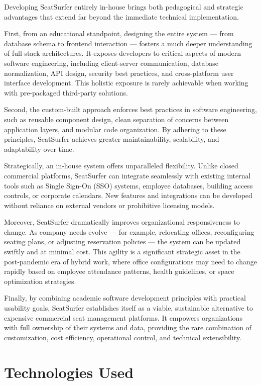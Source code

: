 \documentclass[12pt,a4paper]{report} %
\begin{document}
Developing SeatSurfer entirely in-house brings both pedagogical and strategic advantages that extend far beyond the immediate technical implementation.

First, from an educational standpoint, designing the entire system — from database schema to frontend interaction — fosters a much deeper understanding of full-stack architectures. It exposes developers to critical aspects of modern software engineering, including client-server communication, database normalization, API design, security best practices, and cross-platform user interface development. This holistic exposure is rarely achievable when working with pre-packaged third-party solutions.

Second, the custom-built approach enforces best practices in software engineering, such as reusable component design, clean separation of concerns between application layers, and modular code organization. By adhering to these principles, SeatSurfer achieves greater maintainability, scalability, and adaptability over time.

Strategically, an in-house system offers unparalleled flexibility. Unlike closed commercial platforms, SeatSurfer can integrate seamlessly with existing internal tools such as Single Sign-On (SSO) systems, employee databases, building access controls, or corporate calendars. New features and integrations can be developed without reliance on external vendors or prohibitive licensing models.

Moreover, SeatSurfer dramatically improves organizational responsiveness to change. As company needs evolve — for example, relocating offices, reconfiguring seating plans, or adjusting reservation policies — the system can be updated swiftly and at minimal cost. This agility is a significant strategic asset in the post-pandemic era of hybrid work, where office configurations may need to change rapidly based on employee attendance patterns, health guidelines, or space optimization strategies.

Finally, by combining academic software development principles with practical usability goals, SeatSurfer establishes itself as a viable, sustainable alternative to expensive commercial seat management platforms. It empowers organizations with full ownership of their systems and data, providing the rare combination of customization, cost efficiency, operational control, and technical extensibility.

\newpage

\chapter{Technologies Used}
\end{document}
